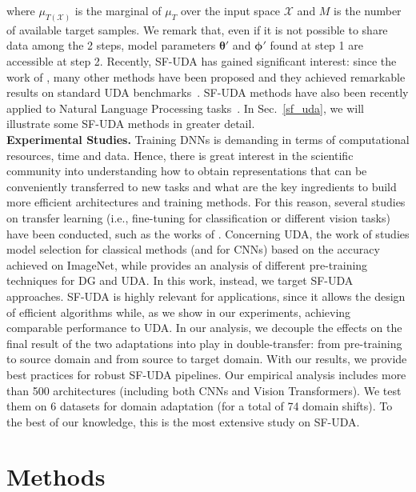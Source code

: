 \documentclass{article}
\begin{document}
where $\mu_{T(\mathcal{X})}$ is the marginal of $\mu_T$ over the input space $\mathcal{X}$ and $M$ is the number of available target samples. We remark that, even if it is not possible to share data among the 2 steps, model parameters $\bm{\theta}'$ and $\bm{\phi}'$ found at step 1 are accessible at step 2. 
Recently, SF-UDA has gained significant interest: since the work of \cite{liang2020we}, many other methods have been proposed and they achieved remarkable results on standard UDA benchmarks~\citep{li2020model, yang2021generalized, kundu2020universal, huang2021model, kurmi2021domain, xia2021adaptive, chu2022denoised, ding2022source, kundu2022balancing}. 
SF-UDA methods have also been recently applied to Natural Language Processing tasks~\citep{su2022comparison}.
In Sec.~\ref{sf_uda}, we will illustrate some SF-UDA methods in greater detail.\\
\textbf{Experimental Studies.} Training DNNs is demanding in terms of computational resources, time and data. 
Hence, there is great interest in the scientific community into understanding how to obtain representations that can be 
conveniently
transferred to new tasks and what are the key ingredients to build more efficient architectures and training methods.
For this reason, several studies  on transfer learning (i.e., fine-tuning for classification or different vision tasks) have been conducted, such as the works of \cite{chu2016best, huh2016makes, kornblith2019better}.
Concerning UDA, the work of \cite{zhang2020impact} studies model selection for classical methods (and for CNNs) based on the  accuracy achieved on ImageNet, while \cite{kim2022broad} provides an analysis of different pre-training techniques for DG and UDA. 
In this work, instead, we target SF-UDA approaches. 
SF-UDA is highly relevant for applications, since it allows the design of efficient algorithms while, as we show in our experiments, achieving comparable performance to UDA. 
In our analysis, we decouple the effects on the final result of the two adaptations into play in  double-transfer: from pre-training to source domain and from source to target domain. 
With our results, we provide best practices for robust SF-UDA pipelines. Our empirical analysis includes more than 500 architectures (including both CNNs and Vision Transformers). We test them on 6 datasets for domain adaptation (for a total of 74 domain shifts). To the best of our knowledge, this is the most extensive study on SF-UDA.


\section{Methods}
\end{document}
